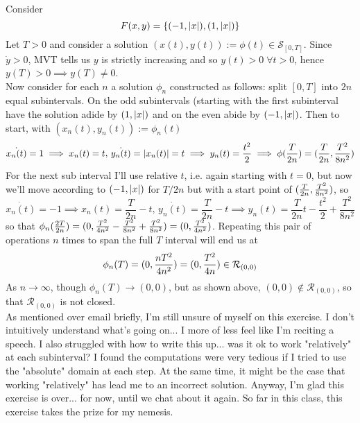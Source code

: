 \documentclass{article}
\newenvironment{ex}[1]
  {\renewcommand\theexercise{#1}\exercise}
  {\endexercise}
\begin{document}
\begin{ex}{5.27} %
  Consider
  $$
  F(x, y) = \{(-1, \lvert x\rvert), (1, \lvert x\rvert)\}
  $$
  Let $T > 0$ and consider a solution $(x(t), y(t)) := \phi(t) \in \mathcal{S}_{[0, T]}$. Since $\dot{y} > 0$, MVT tells us $y$ is strictly increasing and so $y(t) > 0 \; \forall t > 0$, hence $y(T) > 0 \implies  y(T) \ne 0$. \, \\

  Now consider for each $n$ a solution $\phi_n$ constructed as follows: split $[0, T]$ into $2n$ equal subintervals. On the odd subintervals (starting with the first subinterval have the solution adide by $(1, \lvert x\rvert)$ and on the even abide by $(-1, \lvert x\rvert)$. Then to start, with $(x_n(t), y_n(t)) := \phi_n(t)$
  $$
  \dot{x_n(t)} = 1 \implies x_n(t) = t, \, \dot{y_n(t)} = \lvert x_n(t)\rvert = t \implies y_n(t) = \frac{t^2}{2} \implies \phi(\frac{T}{2n}) = (\frac{T}{2n}, \frac{T^2}{8n^2})
  $$
  For the next sub interval I'll use relative $t$, i.e. again starting with $t=0$, but now we'll move according to $(-1, \lvert x\rvert)$ for $T/2n$ but with a start point of $(\frac{T}{2n}, \frac{T^2}{8n^2})$, so
  $$
  \dot{x_n(t)} = -1 \implies x_n(t) = \frac{T}{2n} - t, \, \dot{y_n(t)} = \frac{T}{2n} - t \implies y_n(t) = \frac{T}{2n}t - \frac{t^2}{2} + \frac{T^2}{8n^2}
  $$
  so that $\phi_n(\frac{2T}{2n}) = (0, \frac{T^2}{4n^2} - \frac{T^2}{8n^2} + \frac{T^2}{8n^2}) = (0, \frac{T^2}{4n^2})$. Repeating this pair of operations $n$ times to span the full $T$ interval will end us at
  $$
  \phi_n(T) = (0, \frac{nT^2}{4n^2}) = (0, \frac{T^2}{4n}) \in \mathcal{R}_{(0, 0)}
  $$
  As $n \to \infty$, though $\phi_n(T) \to (0, 0)$, but as shown above, $(0, 0) \not\in \mathcal{R}_{(0, 0)}$, so that $\mathcal{R}_{(0, 0)}$ is not closed. \, \\

  As mentioned over email briefly, I'm still unsure of myself on this exercise. I don't intuitively understand what's going on... I more of less feel like I'm reciting a speech. I also struggled with how to write this up... was it ok to work "relatively" at each subinterval? I found the computations were very tedious if I tried to use the "absolute" domain at each step. At the same time, it might be the case that working "relatively" has lead me to an incorrect solution. Anyway, I'm glad this exercise is over... for now, until we chat about it again. So far in this class, this exercise takes the prize for my nemesis.
\end{ex} %
\end{document}

